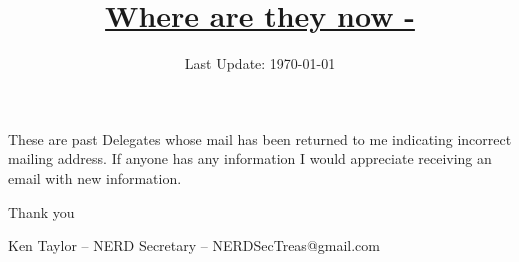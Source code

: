 \documentclass[letterpaper,12pt]{report}
\title{\underline\bf{Where are they now - \the\year}}
\author{}
\date{Last Update: \today}
\begin{document}
\begin{mdframed}[style=mystyle]
\begin{center}
These are past Delegates whose mail has been returned to me indicating incorrect mailing address. If anyone has any information I would appreciate receiving an email with new information.

Thank you

Ken Taylor -- NERD Secretary -- NERDSecTreas@gmail.com
\end{center}
\end{mdframed}


\end{document}
